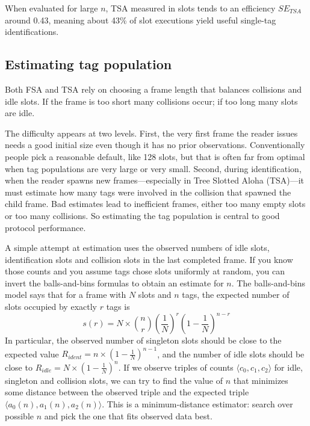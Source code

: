 When evaluated for large $n$, TSA measured in slots tends to an efficiency $SE_{TSA}$ around 0.43, meaning about 43\% of slot executions yield useful single-tag identifications.

\subsection{Estimating tag population}
Both FSA and TSA rely on choosing a frame length that balances collisions and idle slots. If the frame is too short many collisions occur; if too long many slots are idle. 

The difficulty appears at two levels. First, the very first frame the reader issues needs a good initial size even though it has no prior observations. Conventionally people pick a reasonable default, like 128 slots, but that is often far from optimal when tag populations are very large or very small. Second, during identification, when the reader spawns new frames—especially in Tree Slotted Aloha (TSA)—it must estimate how many tags were involved in the collision that spawned the child frame. Bad estimates lead to inefficient frames, either too many empty slots or too many collisions. So estimating the tag population is central to good protocol performance.

A simple attempt at estimation uses the observed numbers of idle slots, identification slots and collision slots in the last completed frame. If you know those counts and you assume tags chose slots uniformly at random, you can invert the balls-and-bins formulas to obtain an estimate for $n$. The balls-and-bins model says that for a frame with $N$ slots and $n$ tags, the expected number of slots occupied by exactly $r$ tags is
\begin{equation*}
    s(r) = N\times \binom{n}{r}\left(\frac{1}{N}\right)^r \left(1 - \frac{1}{N}\right)^{n-r}
\end{equation*}
In particular, the observed number of singleton slots should be close to the expected value $R_{ident} = n\times \left(1 - \frac{1}{N}\right)^{n-1}$, and the number of idle slots should be close to $R_{idle} = N\times \left(1 - \frac{1}{N}\right)^n$. If we observe triples of counts $\langle c_0,c_1,c_2\rangle$ for idle, singleton and collision slots, we can try to find the value of $n$ that minimizes some distance between the observed triple and the expected triple 
$\langle a_0(n),a_1(n),a_2(n)\rangle$. This is a minimum-distance estimator: search over possible $n$ and pick the one that fits observed data best.


